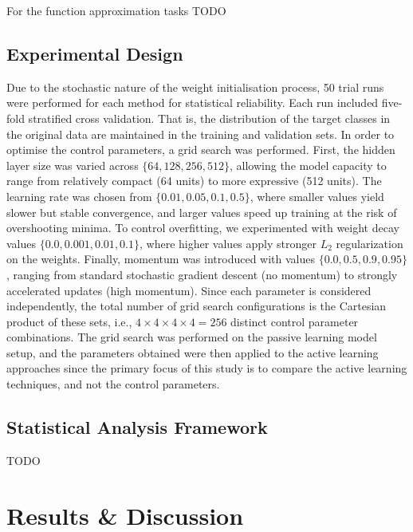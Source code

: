 \documentclass[10pt, conference]{IEEEtran}
\begin{document}
For the function approximation tasks TODO

\subsection{Experimental Design}
Due to the stochastic nature of the weight initialisation process, 50 trial runs were performed for each method for statistical reliability. Each run included five-fold stratified cross validation. That is, the distribution of the target classes in the original data are maintained in the training and validation sets. In order to optimise the control parameters, a grid search was performed. First, the hidden layer size was varied across $\{64, 128, 256, 512\}$, allowing the model capacity to range from relatively compact (64 units) to more expressive (512 units). The learning rate was chosen from  $\{0.01, 0.05, 0.1, 0.5\}$, where smaller values yield slower but stable convergence, and larger values speed up training at the risk of overshooting minima. To control overfitting, we experimented with weight decay values $\{0.0, 0.001, 0.01, 0.1\}$, where higher values apply stronger $L_2$ regularization on the weights. Finally, momentum was introduced with values $\{0.0, 0.5, 0.9, 0.95\}$, ranging from standard stochastic gradient descent (no momentum) to strongly accelerated updates (high momentum). Since each parameter is considered independently, the total number of grid search configurations is the Cartesian product of these sets, i.e., $4 \times 4 \times 4 \times 4 = 256$ distinct control parameter combinations. The grid search was performed on the passive learning model setup, and the parameters obtained were then applied to the active learning approaches since the primary focus of this study is to compare the active learning techniques, and not the control parameters.

\subsection{Statistical Analysis Framework}
TODO

\section{Results \& Discussion}
\end{document}
